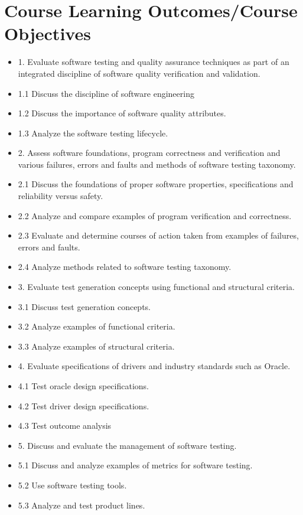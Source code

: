 \section *  {Course Learning Outcomes/Course Objectives}
\begin{itemize}

     \item     1. Evaluate software testing and quality assurance techniques as part of an integrated discipline of software quality verification and validation.

     \item      1.1 Discuss the discipline of software engineering  
     \item      1.2 Discuss the importance of software quality attributes.
     \item      1.3 Analyze the software testing lifecycle.
     \item      2. Assess software foundations, program correctness and verification and various failures, errors and faults and methods of software testing taxonomy.
     \item      2.1 Discuss the foundations of proper software properties, specifications and reliability versus safety.
     \item      2.2 Analyze and compare examples of program verification and correctness.
     \item       2.3 Evaluate and determine courses of action taken from examples of failures, errors and faults.
      \item      2.4 Analyze methods related to software testing taxonomy.
     \item      3. Evaluate test generation concepts using functional and structural criteria.
     \item      3.1 Discuss test generation concepts.
     \item      3.2 Analyze examples of functional criteria.
     \item      3.3 Analyze examples of structural criteria.
     \item      4. Evaluate specifications of drivers and industry standards such as Oracle.      
     \item      4.1 Test oracle design specifications.     
     \item      4.2 Test driver design specifications.       
     \item      4.3 Test outcome analysis             
     \item      5. Discuss and evaluate the management of software testing.          
     \item      5.1 Discuss and analyze examples of metrics for software testing.          
     \item      5.2 Use software testing tools.  
     \item      5.3 Analyze and test product lines.     

     
 \end{itemize}

     

